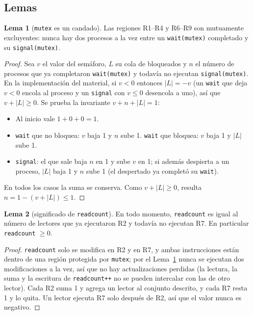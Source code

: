 \documentclass[12pt,letterpaper]{article}
\theoremstyle{definition}
\newtheorem{lema}{Lema}
\newcommand{\sem}[1]{\texttt{#1}}
\begin{document}
\subsection{Lemas}

\begin{lema}[\sem{mutex} es un candado]\label{lem:mutex}
Las regiones R1--R4 y R6--R9 son mutuamente excluyentes: nunca hay dos procesos a la vez entre un \sem{wait(mutex)} completado y su \sem{signal(mutex)}.
\end{lema}
\begin{proof}
Sea $v$ el valor del semáforo, $L$ su cola de bloqueados y $n$ el número de procesos que ya completaron \sem{wait(mutex)} y todavía no ejecutan \sem{signal(mutex)}. En la implementación del material, si $v<0$ entonces $|L| = -v$ (un \sem{wait} que deja $v<0$ encola al proceso y un \sem{signal} con $v\le 0$ desencola a uno), así que $v + |L| \ge 0$. Se prueba la invariante $v + n + |L| = 1$:
\begin{itemize}[itemsep=2pt]
\item Al inicio vale $1 + 0 + 0 = 1$.
\item \sem{wait} que no bloquea: $v$ baja 1 y $n$ sube 1. \sem{wait} que bloquea: $v$ baja 1 y $|L|$ sube 1.
\item \sem{signal}: el que sale baja $n$ en 1 y sube $v$ en 1; si además despierta a un proceso, $|L|$ baja 1 y $n$ sube 1 (el despertado ya completó su \sem{wait}).
\end{itemize}
En todos los casos la suma se conserva. Como $v+|L|\ge 0$, resulta $n = 1 - (v + |L|) \le 1$.
\end{proof}

\begin{lema}[significado de \sem{readcount}]\label{lem:rc}
En todo momento, \sem{readcount} es igual al número de lectores que ya ejecutaron R2 y todavía no ejecutan R7. En particular \sem{readcount} $\ge 0$.
\end{lema}
\begin{proof}
\sem{readcount} solo se modifica en R2 y en R7, y ambas instrucciones están dentro de una región protegida por \sem{mutex}; por el Lema~\ref{lem:mutex} nunca se ejecutan dos modificaciones a la vez, así que no hay actualizaciones perdidas (la lectura, la suma y la escritura de \sem{readcount++} no se pueden intercalar con las de otro lector). Cada R2 suma 1 y agrega un lector al conjunto descrito, y cada R7 resta 1 y lo quita. Un lector ejecuta R7 solo después de R2, así que el valor nunca es negativo.
\end{proof}
\end{document}

